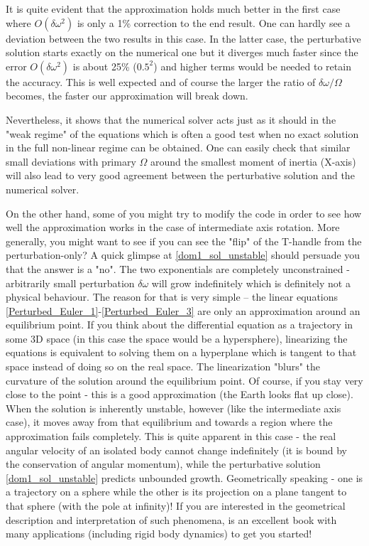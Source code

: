 \documentclass[a4paper]{article}
\begin{document}
	It is quite evident that the approximation holds much better in the first case where $O(\delta\omega^2)$ is only a 1\% correction to the end result.
	One can hardly see a deviation between the two results in this case.
	In the latter case, the perturbative solution starts exactly on the numerical one but it diverges much faster since the error $O(\delta \omega^2)$ is about 25\% ($0.5^2$) and higher terms would be needed to retain the accuracy.
	This is well expected and of course the larger the ratio of $\delta \omega/\Omega$ becomes, the faster our approximation will break down.
	
	Nevertheless, it shows that the numerical solver acts just as it should in the "weak regime" of the equations which is often a good test when no exact solution in the full non-linear regime can be obtained.
	One can easily check that similar small deviations with primary $\Omega$ around the smallest moment of inertia (X-axis) will also lead to very good agreement between the perturbative solution and the numerical solver.

	On the other hand, some of you might try to modify the code in order to see how well the approximation works in the case of intermediate axis rotation.
	More generally, you might want to see if you can see the "flip" of the T-handle from the perturbation-only?
	A quick glimpse at \eqref{dom1_sol_unstable} should persuade you that the answer is a "no".
	The two exponentials are completely unconstrained - arbitrarily small perturbation $\delta \omega$ will grow indefinitely which is definitely not a physical behaviour.
	The reason for that is very simple -- the linear equations \eqref{Perturbed_Euler_1}-\eqref{Perturbed_Euler_3} are only an approximation around an equilibrium point.
	If you think about the differential equation as a trajectory in some 3D space (in this case the space would be a hypersphere), linearizing the equations is equivalent to solving them on a hyperplane which is tangent to that space instead of doing so on the real space.
	The linearization "blurs" the curvature of the solution around the equilibrium point.
	Of course, if you stay very close to the point - this is a good approximation (the Earth looks flat up close).
	When the solution is inherently unstable, however (like the intermediate axis case), it moves away from that equilibrium and towards a region where the approximation fails completely.
	This is quite apparent in this case - the real angular velocity of an isolated body cannot change indefinitely (it is bound by the conservation of angular momentum), while the perturbative solution \eqref{dom1_sol_unstable} predicts unbounded growth.
	Geometrically speaking - one is a trajectory on a sphere while the other is its projection on a plane tangent to that sphere (with the pole at infinity)!
	If you are interested in the geometrical description and interpretation of such phenomena, \cite{Geometry_Frankel} is an excellent book with many applications (including rigid body dynamics) to get you started!
\end{document}
